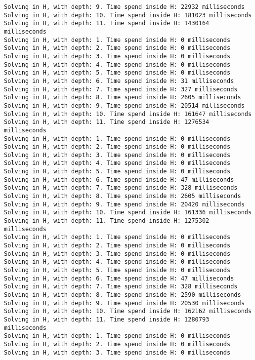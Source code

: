 \begin{lstlisting}[breaklines=true, basicstyle=\ttfamily\footnotesize]
Solving in H, with depth: 9. Time spend inside H: 22932 milliseconds
Solving in H, with depth: 10. Time spend inside H: 181023 milliseconds
Solving in H, with depth: 11. Time spend inside H: 1430164 milliseconds
Solving in H, with depth: 1. Time spend inside H: 0 milliseconds
Solving in H, with depth: 2. Time spend inside H: 0 milliseconds
Solving in H, with depth: 3. Time spend inside H: 0 milliseconds
Solving in H, with depth: 4. Time spend inside H: 0 milliseconds
Solving in H, with depth: 5. Time spend inside H: 0 milliseconds
Solving in H, with depth: 6. Time spend inside H: 31 milliseconds
Solving in H, with depth: 7. Time spend inside H: 327 milliseconds
Solving in H, with depth: 8. Time spend inside H: 2605 milliseconds
Solving in H, with depth: 9. Time spend inside H: 20514 milliseconds
Solving in H, with depth: 10. Time spend inside H: 161647 milliseconds
Solving in H, with depth: 11. Time spend inside H: 1276534 milliseconds
Solving in H, with depth: 1. Time spend inside H: 0 milliseconds
Solving in H, with depth: 2. Time spend inside H: 0 milliseconds
Solving in H, with depth: 3. Time spend inside H: 0 milliseconds
Solving in H, with depth: 4. Time spend inside H: 0 milliseconds
Solving in H, with depth: 5. Time spend inside H: 0 milliseconds
Solving in H, with depth: 6. Time spend inside H: 47 milliseconds
Solving in H, with depth: 7. Time spend inside H: 328 milliseconds
Solving in H, with depth: 8. Time spend inside H: 2605 milliseconds
Solving in H, with depth: 9. Time spend inside H: 20420 milliseconds
Solving in H, with depth: 10. Time spend inside H: 161336 milliseconds
Solving in H, with depth: 11. Time spend inside H: 1275302 milliseconds
Solving in H, with depth: 1. Time spend inside H: 0 milliseconds
Solving in H, with depth: 2. Time spend inside H: 0 milliseconds
Solving in H, with depth: 3. Time spend inside H: 0 milliseconds
Solving in H, with depth: 4. Time spend inside H: 0 milliseconds
Solving in H, with depth: 5. Time spend inside H: 0 milliseconds
Solving in H, with depth: 6. Time spend inside H: 47 milliseconds
Solving in H, with depth: 7. Time spend inside H: 328 milliseconds
Solving in H, with depth: 8. Time spend inside H: 2590 milliseconds
Solving in H, with depth: 9. Time spend inside H: 20530 milliseconds
Solving in H, with depth: 10. Time spend inside H: 162162 milliseconds
Solving in H, with depth: 11. Time spend inside H: 1280793 milliseconds
Solving in H, with depth: 1. Time spend inside H: 0 milliseconds
Solving in H, with depth: 2. Time spend inside H: 0 milliseconds
Solving in H, with depth: 3. Time spend inside H: 0 milliseconds

\end{lstlisting}
